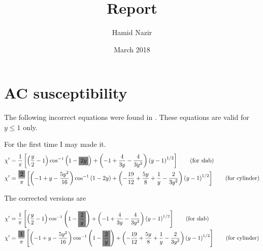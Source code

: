 \documentclass[a4paper]{article}
\title{Report}
\author{Hamid Nazir}
\date{March 2018}
\newcommand{\mathl}[2]{\colorbox{#1}{$\displaystyle #2$}}
\begin{document}
\maketitle

\section{AC susceptibility}

The following incorrect equations were found in \cite{gomory1997characterization}. These equations are valid for $y\leq 1$ only.

For the first time I may made it.
\begin{align*}
{\chi}' &=\frac{1}{\pi }\left [  \left ( \frac{y}{2}-1 \right ) \cos^{-1}\left (1- \mathl{gray}{2y}  \right )+ \left( -1 +\frac{4}{3y}-\frac{4}{3y^2} \right ) \left(y-1 \right )^{1/2}\right ]\tag{for slab}\\
{\chi}' &=\frac{\mathl{gray}{2}}{\pi}\left [\left (-1+y-\frac{5y^2}{16}\right ) \cos^{-1}\left ( 1-2y \right )+\left (-\frac{19}{12} + \frac{5y}{8}+\frac{1}{y}-\frac{2}{3y^2}\right ) \left (y-1 \right )^{1/2} \right ] \tag{for cylinder}
\end{align*}

The corrected versions are \cite{goldfarb1991alternating}

\begin{align*}
{\chi}' &=\frac{1}{\pi }\left [  \left (\frac{y}{2}-1  \right ) \cos^{-1}\left (1-\mathl{gray}{\frac{2}{y}}  \right )+ \left( -1 +\frac{4}{3y}-\frac{4}{3y^2} \right ) \left(y-1 \right )^{1/2}\right ]\tag{for slab}\\
{\chi}' &=\frac{\mathl{gray}{1}}{\pi}\left [\left (-1+y-\frac{5y^2}{16}\right ) \cos^{-1}\left ( 1-\mathl{gray}{\frac{2}{y}}\right )+\left (-\frac{19}{12} + \frac{5y}{8}+\frac{1}{y}-\frac{2}{3y^2}\right ) \left (y-1 \right )^{1/2} \right ]\tag{for cylinder}
\end{align*}


\end{document}
